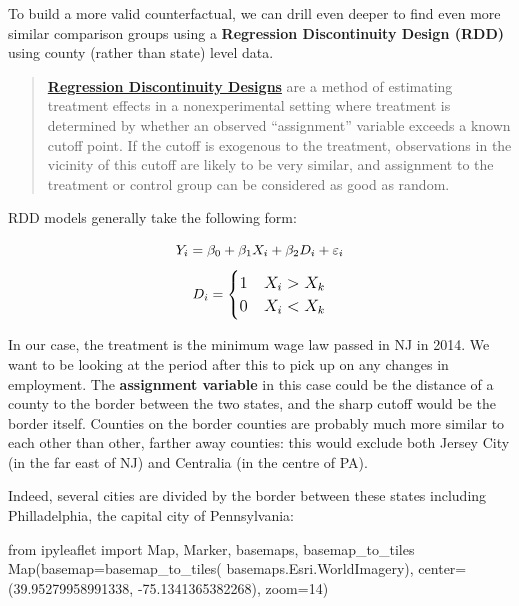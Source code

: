\documentclass[
  letterpaper,
  DIV=11,
  numbers=noendperiod]{scrreprt}
\newenvironment{Shaded}{\begin{snugshade}}{\end{snugshade}}
\newcommand{\DecValTok}[1]{\textcolor[rgb]{0.68,0.00,0.00}{#1}}
\newcommand{\FloatTok}[1]{\textcolor[rgb]{0.68,0.00,0.00}{#1}}
\newcommand{\ImportTok}[1]{\textcolor[rgb]{0.00,0.46,0.62}{#1}}
\newcommand{\NormalTok}[1]{\textcolor[rgb]{0.00,0.23,0.31}{#1}}
\newcommand{\OperatorTok}[1]{\textcolor[rgb]{0.37,0.37,0.37}{#1}}
\begin{document}
To build a more valid counterfactual, we can drill even deeper to find
even more similar comparison groups using a \textbf{Regression
Discontinuity Design (RDD)} using county (rather than state) level data.

\begin{quote}
\textbf{\href{https://www.princeton.edu/~davidlee/wp/RDDEconomics.pdf}{Regression
Discontinuity Designs}} are a method of estimating treatment effects in
a nonexperimental setting where treatment is determined by whether an
observed ``assignment'' variable exceeds a known cutoff point. If the
cutoff is exogenous to the treatment, observations in the vicinity of
this cutoff are likely to be very similar, and assignment to the
treatment or control group can be considered as good as random.
\end{quote}

RDD models generally take the following form:

\[\huge Y_{i} = \beta_0 + \beta_1 X_i + \beta_2 D_i + \varepsilon_{i}\]
\[\large D_i=    \begin{cases}
      1 & X_i>X_k\\
      0 & X_i<X_k\\
    \end{cases} \]

In our case, the treatment is the minimum wage law passed in NJ in 2014.
We want to be looking at the period after this to pick up on any changes
in employment. The \textbf{assignment variable} in this case could be
the distance of a county to the border between the two states, and the
sharp cutoff would be the border itself. Counties on the border counties
are probably much more similar to each other than other, farther away
counties: this would exclude both Jersey City (in the far east of NJ)
and Centralia (in the centre of PA).

Indeed, several cities are divided by the border between these states
including Philladelphia, the capital city of Pennsylvania:

\begin{Shaded}
\begin{Highlighting}[]
\ImportTok{from}\NormalTok{ ipyleaflet }\ImportTok{import}\NormalTok{ Map, Marker, basemaps, basemap\_to\_tiles}
\NormalTok{Map(basemap}\OperatorTok{=}\NormalTok{basemap\_to\_tiles(}
\NormalTok{    basemaps.Esri.WorldImagery),}
\NormalTok{  center}\OperatorTok{=}\NormalTok{(}\FloatTok{39.95279958991338}\NormalTok{, }\OperatorTok{{-}}\FloatTok{75.1341365382268}\NormalTok{),}
\NormalTok{  zoom}\OperatorTok{=}\DecValTok{14}\NormalTok{)}
\end{Highlighting}
\end{Shaded}
\end{document}
